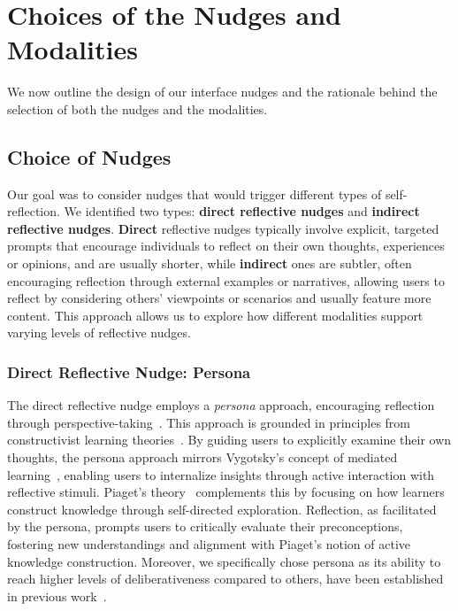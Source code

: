 \section{Choices of the Nudges and Modalities}
\label{sec: section3}
We now outline the design of our interface nudges and the rationale behind the selection of both the nudges and the modalities.

\subsection{Choice of Nudges}
Our goal was to consider nudges that would trigger different types of self-reflection. We identified two types: \textbf{direct reflective nudges} and \textbf{indirect reflective nudges}. \textbf{Direct} reflective nudges typically involve explicit, targeted prompts that encourage individuals to reflect on their own thoughts, experiences or opinions, and are usually shorter, while \textbf{indirect} ones are subtler, often encouraging reflection through external examples or narratives, allowing users to reflect by considering others' viewpoints or scenarios and usually feature more content. This approach allows us to explore how different modalities support varying levels of reflective nudges.

\subsubsection{Direct Reflective Nudge: Persona}
The direct reflective nudge employs a \textit{persona} approach, encouraging reflection through perspective-taking~\cite{galinsky2000perspective, kim2019crowdsourcing, zhang2021nudge}. This approach is grounded in principles from constructivist learning theories~\cite{vygotsky1978mind, piaget1985equilibration}. By guiding users to explicitly examine their own thoughts, the persona approach mirrors Vygotsky's concept of mediated learning~\cite{vygotsky1978mind}, enabling users to internalize insights through active interaction with reflective stimuli. Piaget's theory~\cite{piaget1985equilibration} complements this by focusing on how learners construct knowledge through self-directed exploration. Reflection, as facilitated by the persona, prompts users to critically evaluate their preconceptions, fostering new understandings and alignment with Piaget’s notion of active knowledge construction. Moreover, we specifically chose persona as its ability to reach higher levels of deliberativeness compared to others, have been established in previous work~\cite{yeo2024help}.

